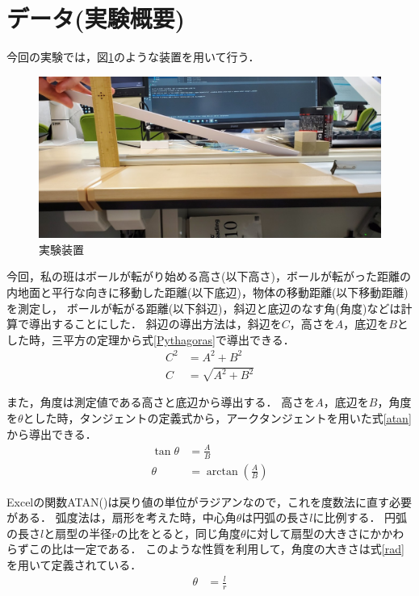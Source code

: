 \documentclass[titlepage,a4paper]{jsarticle}
\begin{document}
\section{データ(実験概要)}
今回の実験では，図\ref{実験装置}のような装置を用いて行う．
\begin{figure}[H]
  \centering
  \includegraphics[width=12cm]{img/data_science1.jpg}
  \caption{実験装置}
  \label{実験装置}
\end{figure}

今回，私の班はボールが転がり始める高さ(以下高さ)，ボールが転がった距離の内地面と平行な向きに移動した距離(以下底辺)，物体の移動距離(以下移動距離)を測定し，
ボールが転がる距離(以下斜辺)，斜辺と底辺のなす角(角度)などは計算で導出することにした．
斜辺の導出方法は，斜辺を$C$，高さを$A$，底辺を$B$とした時，三平方の定理から式\eqref{Pythagoras}で導出できる．
\begin{align}
  C^{2} & = A^{2} + B^{2}                           \\
  C     & = \sqrt{A^{2} + B^{2}} \label{Pythagoras}
\end{align}

また，角度は測定値である高さと底辺から導出する．
高さを$A$，底辺を$B$，角度を$\theta$とした時，タンジェントの定義式から，アークタンジェントを用いた式\eqref{atan}から導出できる．
\begin{align}
  \tan \theta & = \frac{A}{B}                                   \\
  \theta      & = \arctan \left(\frac{A}{B}\right) \label{atan}
\end{align}

Excelの関数ATAN()は戻り値の単位がラジアンなので，これを度数法に直す必要がある．
弧度法は，扇形を考えた時，中心角$\theta$は円弧の長さ$l$に比例する．
円弧の長さ$l$と扇型の半径$r$の比をとると，同じ角度$\theta$に対して扇型の大きさにかかわらずこの比は一定である．
このような性質を利用して，角度の大きさは式\eqref{rad}を用いて定義されている．
\begin{align}
  \theta & = \frac{l}{r}\label{rad}
\end{align}
\end{document}
